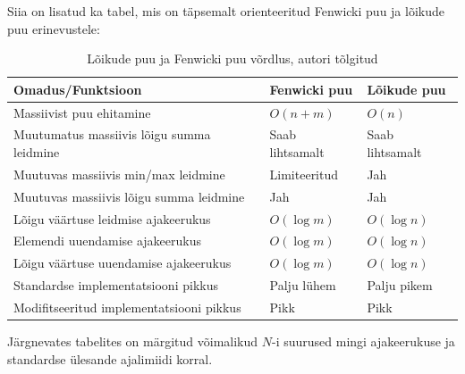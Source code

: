 \documentclass{trkut}
\begin{document}
Siia on lisatud ka tabel, mis on täpsemalt orienteeritud Fenwicki puu ja lõikude puu erinevustele:
\begin{table}[H]
\caption{Lõikude puu ja Fenwicki puu võrdlus, autori tõlgitud}
\begin{tabular}{|l|l|l|}
\hline
Omadus/Funktsioon                         & Fenwicki puu    & Lõikude puu     \\ \hline
Massiivist puu ehitamine                  & $O(n+m)$        & $O(n)$          \\ \hline
Muutumatus massiivis lõigu summa leidmine & Saab lihtsamalt & Saab lihtsamalt \\ \hline
Muutuvas massiivis min/max leidmine       & Limiteeritud    & Jah             \\ \hline
Muutuvas massiivis lõigu summa leidmine   & Jah             & Jah             \\ \hline
Lõigu väärtuse leidmise ajakeerukus       & $O(\log m)$     & $O(\log n)$     \\ \hline
Elemendi uuendamise ajakeerukus           & $O(\log m)$     & $O(\log n)$     \\ \hline
Lõigu väärtuse uuendamise ajakeerukus     & $O(\log m)$     & $O(\log n)$     \\ \hline
Standardse implementatsiooni pikkus       & Palju lühem     & Palju pikem     \\ \hline
Modifitseeritud implementatsiooni pikkus  & Pikk            & Pikk            \\ \hline
\end{tabular}  
\end{table}


Järgnevates tabelites on märgitud võimalikud $N$-i suurused mingi ajakeerukuse ja standardse ülesande ajalimiidi korral\parencite{timecomplexity}. 
\end{document}
